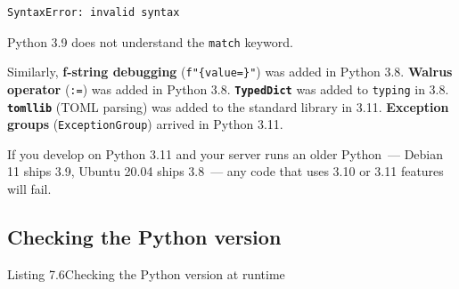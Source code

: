 \begin{outputbox}[short]
\begin{Verbatim}[fontsize=\codesize, breaklines, breakanywhere, breaksymbolleft={\tiny\textcolor{muted}{$\hookrightarrow$}}]
SyntaxError: invalid syntax
\end{Verbatim}
\end{outputbox}

\noindent{}Python 3.9 does not understand the \texttt{match} keyword.

Similarly, \textbf{f-string debugging} (\texttt{f"\{value=\}"}) was added in Python 3.8. \textbf{Walrus operator} (\texttt{:=}) was added in Python 3.8. \textbf{\texttt{TypedDict}} was added to \texttt{typing} in 3.8. \textbf{\texttt{tomllib}} (TOML parsing) was added to the standard library in 3.11. \textbf{Exception groups} (\texttt{ExceptionGroup}) arrived in Python 3.11.

If you develop on Python 3.11 and your server runs an older Python~--- Debian 11 ships 3.9, Ubuntu 20.04 ships 3.8~--- any code that uses 3.10 or 3.11 features will fail.

\subsection*{Checking the Python version}\label{07-environment-drift:checking-the-python-version}

\begin{codeboxcap}[short]{\textcolor{accent}{Listing 7.6}\enspace Checking the Python version at runtime}

\begin{Shaded}
\begin{Highlighting}[]



\OperatorTok{\textless{}}\NormalTok{ (}\NormalTok{, }\NormalTok{):}
     \NormalTok{(}
        \SpecialCharTok{\{}\SpecialCharTok{\}}\SpecialCharTok{\{}\SpecialCharTok{\}}
\NormalTok{    )}
\end{Highlighting}
\end{Shaded}

\end{codeboxcap}

